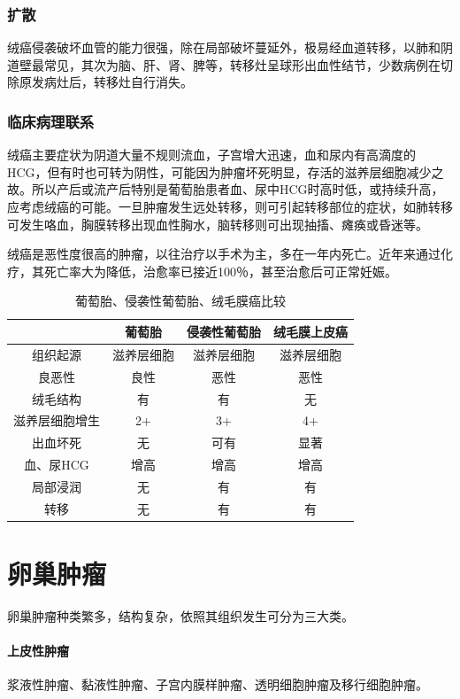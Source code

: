 \subsubsection{扩散}

绒癌侵袭破坏血管的能力很强，除在局部破坏蔓延外，极易经血道转移，以肺和阴道壁最常见，其次为脑、肝、肾、脾等，转移灶呈球形出血性结节，少数病例在切除原发病灶后，转移灶自行消失。

\subsubsection{临床病理联系}

绒癌主要症状为阴道大量不规则流血，子宫增大迅速，血和尿内有高滴度的HCG，但有时也可转为阴性，可能因为肿瘤坏死明显，存活的滋养层细胞减少之故。所以产后或流产后特别是葡萄胎患者血、尿中HCG时高时低，或持续升高，应考虑绒癌的可能。一旦肿瘤发生远处转移，则可引起转移部位的症状，如肺转移可发生咯血，胸膜转移出现血性胸水，脑转移则可出现抽搐、瘫痪或昏迷等。

绒癌是恶性度很高的肿瘤，以往治疗以手术为主，多在一年内死亡。近年来通过化疗，其死亡率大为降低，治愈率已接近100％，甚至治愈后可正常妊娠。

\begin{table}[ht]
    \caption{葡萄胎、侵袭性葡萄胎、绒毛膜癌比较}
    \label{tab11-1}
    \centering
    \begin{tabular}{cccc}
    \toprule
    &葡萄胎&侵袭性葡萄胎&绒毛膜上皮癌\\
    \midrule
    组织起源&滋养层细胞&滋养层细胞&滋养层细胞\\
良恶性&良性&恶性&恶性\\
绒毛结构&有&有&无\\
滋养层细胞增生&2+&3+&4+\\
出血坏死&无&可有&显著\\
血、尿HCG&增高&增高&增高\\
局部浸润&无&有&有\\
转移&无&有&有\\
    \bottomrule
    \end{tabular}
\end{table}

\section{卵巢肿瘤}

卵巢肿瘤种类繁多，结构复杂，依照其组织发生可分为三大类。

\paragraph{上皮性肿瘤}
浆液性肿瘤、黏液性肿瘤、子宫内膜样肿瘤、透明细胞肿瘤及移行细胞肿瘤。

